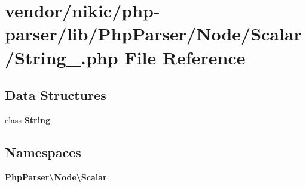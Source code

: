 \section{vendor/nikic/php-\/parser/lib/\+Php\+Parser/\+Node/\+Scalar/\+String\+\_\+.php File Reference}
\label{_scalar_2_string___8php}
\subsection*{Data Structures}
\begin{DoxyCompactItemize}
\item 
class {\bf String\+\_\+}
\end{DoxyCompactItemize}
\subsection*{Namespaces}
\begin{DoxyCompactItemize}
\item 
 {\bf Php\+Parser\textbackslash{}\+Node\textbackslash{}\+Scalar}
\end{DoxyCompactItemize}
